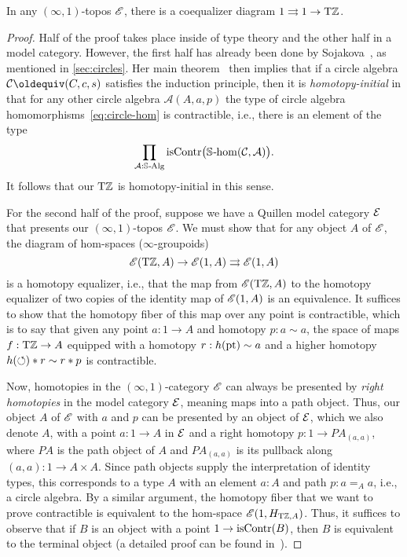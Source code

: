 \documentclass[a4paper,12pt]{amsart}
\begin{document}
\begin{theorem}\label{thm:torz-coeq}
  In any $(\infty,1)$-topos $\mathscr{E}$, there is a coequalizer diagram $1 \rightrightarrows 1 \to {\mathrm{T}\mathbb{Z}}$.
\end{theorem}
\begin{proof}
  Half of the proof takes place inside of type theory and the other half in a model category.
  However, the first half has already been done by Sojakova~\cite{sojakova:hits-hias},
  as mentioned in \cref{sec:circles}.
  Her main theorem~\cite[Theorem 50]{sojakova:hits-hias} then implies that if a circle algebra $\mathcal C\jdeq(C,c,s)$ satisfies the induction principle,
  then it is \emph{homotopy-initial} in that for any other circle algebra $\mathcal A(A,a,p)$
  the type of circle algebra homomorphisms~\eqref{eq:circle-hom}
  is contractible, i.e., there is an element of the type
  \[
    \prod_{\mathcal A:\mathord{\mathbb{S}\textup{\kern.5pt-\kern-.5pt}\mathrm{Alg}}} \mathrm{isContr}\bigl(\mathop{\mathbb{S}\textup{\kern.5pt-\kern-.5pt}\mathrm{hom}}(\mathcal C,\mathcal A)\bigr).
  \]
It follows that our ${\mathrm{T}\mathbb{Z}}$ is homotopy-initial in this sense.

For the second half of the proof, suppose we have a Quillen model category $\mathcal{E}$ that presents our $(\infty,1)$-topos $\mathscr{E}$.
We must show that for any object $A$ of $\mathscr{E}$, the diagram of hom-spaces ($\infty$-groupoids)
\[ \mathscr{E}({\mathrm{T}\mathbb{Z}},A) \to \mathscr{E}(1,A) \rightrightarrows \mathscr{E}(1,A) \]
is a homotopy equalizer, i.e., that the map from $\mathscr{E}({\mathrm{T}\mathbb{Z}},A)$ to the homotopy equalizer of two copies of the identity map of $\mathscr{E}(1,A)$ is an equivalence.
It suffices to show that the homotopy fiber of this map over any point is contractible, which is to say that given any point $a:1\to A$ and homotopy $p:a\sim a$, the space of maps $f:{\mathrm{T}\mathbb{Z}}\to A$ equipped with a homotopy $r : h({\mathord{\mathrm{pt}}}) \sim a$ and a higher homotopy $h({\circlearrowleft}) * r \sim r * p$ is contractible.

Now, homotopies in the $(\infty,1)$-category $\mathscr{E}$ can always be presented by \emph{right homotopies} in the model category $\mathcal{E}$, meaning maps into a path object.
Thus, our object $A$ of $\mathscr{E}$ with $a$ and $p$ can be presented by an object of $\mathcal{E}$, which we also denote $A$, with a point $a:1\to A$ in $\mathcal{E}$ and a right homotopy $p:1\to P A_{(a,a)}$, where $P A$ is the path object of $A$ and $P A_{(a,a)}$ is its pullback along $(a,a):1\to A\times A$.
Since path objects supply the interpretation of identity types, this corresponds to a type $A$ with an element $a:A$ and path $p:a=_A a$, i.e., a circle algebra.
By a similar argument, the homotopy fiber that we want to prove contractible is equivalent to the hom-space $\mathscr{E}(1, H_{{\mathrm{T}\mathbb{Z}},A})$.
Thus, it suffices to observe that if $B$ is an object with a point $1\to \mathrm{isContr}(B)$, then $B$ is equivalent to the terminal object (a detailed proof can be found in~\cite[Lemma 4.1]{shulman:elreedy}).
\end{proof}
\end{document}
